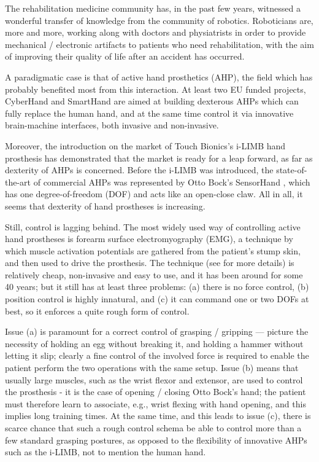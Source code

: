 The rehabilitation medicine community has, in the past few years,
witnessed a wonderful transfer of knowledge from the community of
robotics. Roboticians are, more and more, working along with doctors
and physiatrists in order to provide mechanical / electronic artifacts
to patients who need rehabilitation, with the aim of improving their
quality of life after an accident has occurred.

A paradigmatic case is that of active hand prosthetics (AHP), the
field which has probably benefited most from this interaction. At
least two EU funded projects, CyberHand \cite{cyberhand} and SmartHand
\cite{smarthand} are aimed at building dexterous AHPs which can fully
replace the human hand, and at the same time control it via innovative
brain-machine interfaces, both invasive and non-invasive.

Moreover, the introduction on the market of Touch Bionics's i-LIMB
hand prosthesis \cite{ilimb} has demonstrated that the market is ready
for a leap forward, as far as dexterity of AHPs is concerned. Before
the i-LIMB was introduced, the state-of-the-art of commercial AHPs was
represented by Otto Bock's SensorHand \cite{sensorhand}, which has one
degree-of-freedom (DOF) and acts like an open-close claw. All in all,
it seems that dexterity of hand prostheses is increasing.

Still, control is lagging behind. The most widely used way of
controlling active hand prostheses is forearm surface electromyography
(EMG), a technique by which muscle activation potentials are gathered
from the patient's stump skin, and then used to drive the
prosthesis. The technique (see \cite{deluca} for more details) is
relatively cheap, non-invasive and easy to use, and it has been around
for some 40 years; but it still has at least three problems: (a) there
is no force control, (b) position control is highly innatural, and (c)
it can command one or two DOFs at best, so it enforces a quite rough
form of control.

Issue (a) is paramount for a correct control of grasping / gripping
--- picture the necessity of holding an egg without breaking it, and
holding a hammer without letting it slip; clearly a fine control of
the involved force is required to enable the patient perform the two
operations with the same setup. Issue (b) means that usually large
muscles, such as the wrist flexor and extensor, are used to control
the prosthesis - it is the case of opening / closing Otto Bock's hand;
the patient must therefore learn to associate, e.g., wrist flexing
with hand opening, and this implies long training times. At the same
time, and this leads to issue (c), there is scarce chance that such a
rough control schema be able to control more than a few standard
grasping postures, as opposed to the flexibility of innovative AHPs
such as the i-LIMB, not to mention the human hand.

